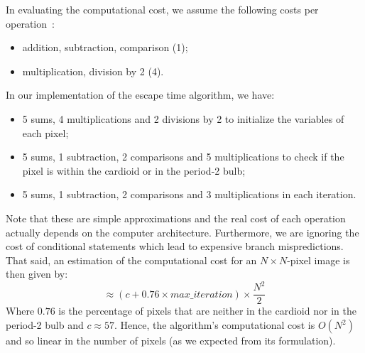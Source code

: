 \documentclass[11pt,a4paper]{article}
\begin{document}
\noindent
In evaluating the computational cost, we assume the following costs per operation~\cite{costs}:
\begin{itemize}
	\vspace{-0.2cm}
	\itemsep0em 
	
	\item addition, subtraction, comparison (1);
	\item multiplication, division by 2 (4).
	\vspace{-0.15cm}
\end{itemize} 
In our implementation of the escape time algorithm, we have:
\begin{itemize}
	\vspace{-0.2cm}
	\itemsep0em 
	
	\item 5 sums, 4 multiplications and 2 divisions by 2 to initialize the variables of each pixel;
	\item 5 sums, 1 subtraction, 2 comparisons and 5 multiplications to check if the pixel is within the cardioid or in the period-2 bulb;
	\item 5 sums, 1 subtraction, 2 comparisons and 3 multiplications in each iteration.
\end{itemize}
\vspace*{-1.1cm}
Note that these are simple approximations and the real cost of each operation actually depends on the computer architecture.
Furthermore, we are ignoring the cost of conditional statements which lead to expensive branch mispredictions.\\
That said, an estimation of the computational cost for an $N\times N$-pixel image is then given by:
\vspace{-0.15cm}
$$\approx (c + 0.76\times max\_iteration) \times \dfrac{N^2}{2}$$
\vspace{-0.1cm}
\noindent
Where $0.76$ is the percentage of pixels that are neither in the cardioid nor in the period-2 bulb and $c\approx 57$.
Hence, the algorithm's computational cost is $O(N^2)$ and so linear in the number of pixels (as we expected from its formulation).\\[-7pt]
\end{document}
